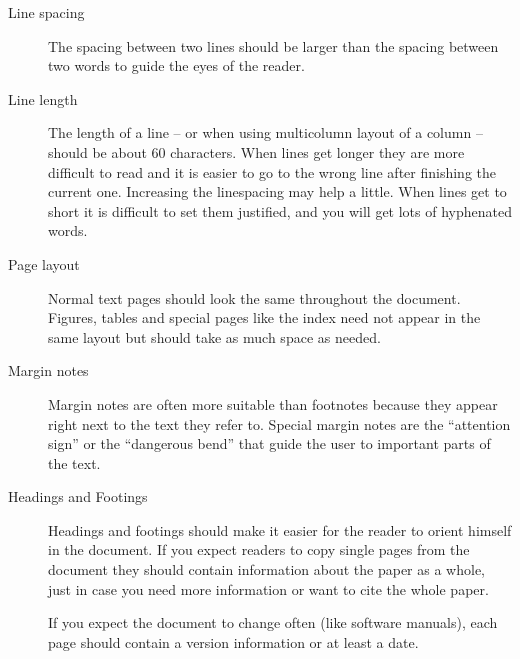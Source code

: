 \begin{description}

\item[Line spacing]
        The spacing between two lines should be larger than the spacing 
        between two words to guide the eyes of the reader.

\item[Line length]
        The length of a line -- or when using multicolumn layout of a 
        column -- should be about 60 characters. When lines get longer they 
        are more difficult to read and it is easier to go to the wrong line 
        after finishing the current one. Increasing the linespacing may help a 
        little.
        When lines get to short it is difficult to set them justified, and you 
        will get lots of hyphenated words.
        
\item[Page layout]
        Normal text pages should look the same throughout the document. 
        Figures, tables and special pages like the index need not appear in 
        the same layout but should take as much space as needed.
        
\item[Margin notes]
        Margin notes are often more suitable than footnotes because they 
        appear right next to the text they refer to. Special margin notes are 
        the ``attention sign'' or the ``dangerous bend'' that guide the user 
        to important parts of the text.
        
\item[Headings and Footings]
        Headings and footings should make it easier for the reader to orient
        himself in the document. If you expect readers to copy single pages
        from the document they should contain information about the paper as
        a whole, just in case you need more information or want to cite the
        whole paper.
        
        If you expect the document to change often (like software manuals),
        each page should contain a version information or at least a date.
        
\end{description}


\endinput
